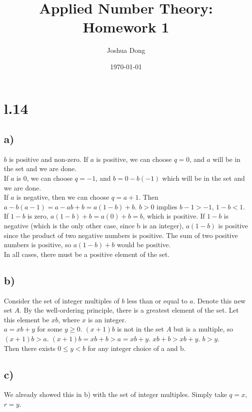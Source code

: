 \documentclass{article}
\begin{document}
\title{Applied Number Theory: Homework 1}
\author{Joshua Dong}
\date{\today}
\maketitle

\section{l.14}
\subsection{a)}
$b$ is positive and non-zero.
If $a$ is positive, we can choose $q = 0$, and $a$ will be in the set and we are done.
\\
If $a$ is 0, we can choose $q = -1$, and $b = 0 - b(-1)$ which will be in the set and we are done.
\\
If $a$ is negative, then we can choose
$q = a + 1$.
Then $a - b(a - 1) = a - ab + b = a(1 - b) + b$.
$b > 0$ implies $b - 1 > -1$, $1 - b < 1$.
If $1 - b$ is zero, $a(1 - b) + b = a(0) + b = b$, which is positive.
If $1 - b$ is negative (which is the only other case, since b is an integer), $a(1 - b)$ is positive since the product of two negative numbers is positive.
The sum of two positive numbers is positive, so $a(1 - b) + b$ would be positive.
\\
In all cases, there must be a positive element of the set.

\subsection{b)}
Consider the set of integer multiples of $b$ less than or equal to $a$. Denote this new set $A$. By the well-ordering principle, there is a greatest element of the set. Let this element be $xb$, where $x$ is an integer. 
\\
$a = xb + y$ for some $y \ge 0$.
$(x+1)b$ is not in the set $A$ but is a multiple, so $(x+1)b > a$.
$(x+1)b = xb + b > a = xb + y$.
$xb + b > xb + y$.
$b > y$.
\\
Then there exists $0 \le y < b$ for any integer choice of a and b.

\subsection{c)}
We already showed this in b) with the set of integer multiples. Simply take $q = x$, $r = y$.
\end{document}
